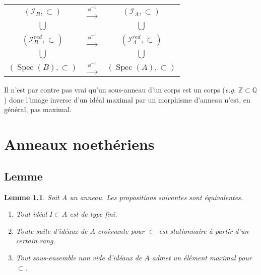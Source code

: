 \documentclass[a4paper, oneside, 12pt]{book}
\theoremstyle{theoremeStyle} %
\newtheorem{lemme}[theoreme]{Lemme}
\theoremstyle{definition} %
\DeclareMathOperator{\Spec}{Spec}
\newcommand{\Q}{\mathbb{Q}}
\newcommand{\Z}{\mathbb{Z}}
\begin{document}
\begin{center}
\begin{tabular}[t]{ccc}
    $(\mathcal{I}_B,\subset)$&$\stackrel{ \phi^{-1}}{\rightarrow}$&$ (\mathcal{I}_A,\subset)$\\
    $\displaystyle{\bigcup}$ &&$\displaystyle{\bigcup}$\\
    $(\mathcal{I}_B^{red},\subset)$&$\stackrel{ \phi^{-1}}{\rightarrow}$&$ (\mathcal{I}_A^{red},\subset)$\\
    $\displaystyle{\bigcup}$ &&$\displaystyle{\bigcup}$\\
    $(\Spec(B),\subset)$&$\stackrel{ \phi^{-1}}{\rightarrow}$&$ (\Spec(A),\subset)$\\
\end{tabular}
\end{center}
Il n'est par contre pas vrai qu'un sous-anneau d'un corps est un corps (\textit{e.g.} $\Z\subset \Q$) donc l'image inverse d'un idéal maximal par un morphisme d'anneau n'est, en général, pas maximal.

\chapter{Anneaux noethériens}\label{AnneauNoetherien}
\section{Lemme}\label{NoethDef}

\begin{lemme}\label{NoethDef}
  Soit $A$ un anneau. Les propositions suivantes sont équivalentes.
  \begin{enumerate}[leftmargin=* ,parsep=0cm,itemsep=0cm,topsep=0cm]
  \item  Tout idéal $I\subset A$ est de type fini.
  \item  Toute suite  d'idéaux de $A$ croissante pour $\subset$ est stationnaire à partir d'un certain rang.
  \item Tout sous-ensemble non vide d'idéaux de $A$ admet un élément maximal pour $\subset $.
  \end{enumerate}
\end{lemme}
\end{document}
